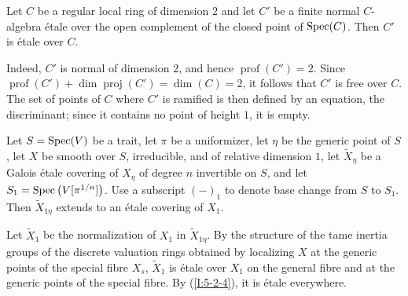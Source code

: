 \begin{lemma} \label{I:5-2-4} %
Let $C$ be a regular local ring of dimension $2$ and let $C'$ be a
finite normal $C$-algebra étale over the open complement of the closed
point of $\operatorname{Spec}(C)$. Then $C'$ is étale over $C$.
\end{lemma}

Indeed, $C'$ is normal of dimension $2$, and hence
$\operatorname{prof}(C')=2$. Since
$\operatorname{prof}(C')+\dim\operatorname{proj}(C')=\dim(C)=2$, it
follows that $C'$ is free over $C$. The set of points of $C$ where $C'$
is ramified is then defined by an equation, the discriminant; since it
contains no point of height $1$, it is empty.

\begin{lemma}\label{I:5-2-5} %
Let $S=\operatorname{Spec}(V)$ be a trait, let $\pi$ be a uniformizer, let $\eta$ be
the generic point of $S$, let $X$ be smooth over $S$, irreducible, and
of relative dimension $1$, let $\widetilde X_\eta$ be a Galois étale
covering of $X_\eta$ of degree $n$ invertible on $S$, and let
$S_1=\operatorname{Spec}\left(V[\pi^{1/n}]\right)$. Use a subscript $(-)_1$ to denote
base change from $S$ to $S_1$. Then $\widetilde X_{1\eta}$ extends to an
étale covering of $X_1$.
\end{lemma}

Let $\widetilde X_1$ be the normalization of $X_1$ in
$\widetilde X_{1\eta}$. By the structure of the tame inertia groups of
the discrete valuation rings obtained by localizing $X$ at the generic
points of the special fibre $X_s$, $\widetilde X_1$ is étale over $X_1$
on the general fibre and at the generic points of the special fibre. By
(\ref{I:5-2-4}), it is étale everywhere.

\subsubsection{}\label{I:5-2-6} %


